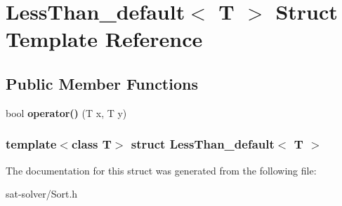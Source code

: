 \hypertarget{structLessThan__default}{\section{\-Less\-Than\-\_\-default$<$ \-T $>$ \-Struct \-Template \-Reference}
\label{structLessThan__default}
}
\subsection*{\-Public \-Member \-Functions}
\begin{DoxyCompactItemize}
\item 
\hypertarget{structLessThan__default_a0888e32196c15a7b2a0813d56fd3276b}{bool {\bfseries operator()} (\-T x, \-T y)}\label{structLessThan__default_a0888e32196c15a7b2a0813d56fd3276b}

\end{DoxyCompactItemize}
\subsubsection*{template$<$class T$>$ struct Less\-Than\-\_\-default$<$ T $>$}



\-The documentation for this struct was generated from the following file\-:\begin{DoxyCompactItemize}
\item 
sat-\/solver/\-Sort.\-h\end{DoxyCompactItemize}

